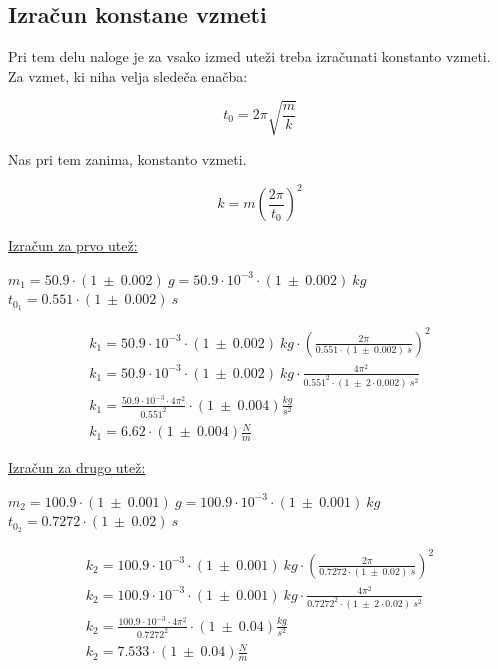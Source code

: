 \documentclass{report}
\begin{document}
\pagebreak

\subsection{Izračun konstane vzmeti}

\noindent Pri tem delu naloge je za vsako izmed uteži treba izračunati konstanto vzmeti.
\\
\noindent Za vzmet, ki niha velja sledeča enačba:

\begin{equation}
  t_0 = 2 \pi \sqrt{\frac{m}{k}}
\end{equation}

\noindent Nas pri tem zanima, konstanto vzmeti.

\begin{equation}
  k = m \left(\frac{2 \pi}{t_0}\right)^2
\end{equation}

\noindent \underline{Izračun za prvo utež:}

\noindent $m_1 = 50.9 \cdot (1 \ \pm \ 0.002) \ g = 50.9 \cdot 10^{-3} \cdot (1 \ \pm \ 0.002) \ kg$ \\
$t_{0_1} = 0.551 \cdot (1 \ \pm \ 0.002) \ s$

\begin{equation}
  \label{eq:1}
  \begin{gathered}
    k_1 = 50.9 \cdot 10^{-3} \cdot (1 \ \pm \ 0.002) \ kg \cdot \left(\frac{2 \pi}{0.551 \cdot (1 \ \pm \ 0.002) \ s}\right)^2 \\
    k_1 = 50.9 \cdot 10^{-3} \cdot (1 \ \pm \ 0.002) \ kg \cdot \frac{4 {\pi}^2}{0.551^2 \cdot (1 \ \pm \ 2 \cdot 0.002) \ s^2} \\
    k_1 = \frac{50.9 \cdot 10^{-3} \cdot 4 {\pi}^2}{0.551^2} \cdot (1 \ \pm \ 0.004) \frac{kg}{s^2} \\
    \boxed {k_1 = 6.62 \cdot (1 \ \pm \ 0.004) \frac{N}{m}}
  \end{gathered}
\end{equation}



\noindent \underline{Izračun za drugo utež:}

\noindent $m_2 = 100.9 \cdot (1 \ \pm \ 0.001) \ g = 100.9 \cdot 10^{-3} \cdot (1 \ \pm \ 0.001) \ kg$ \\
$t_{0_2} = 0.7272 \cdot (1 \ \pm \ 0.02) \ s$

\begin{equation}
  \label{eq:1}
  \begin{gathered}
    k_2 = 100.9 \cdot 10^{-3} \cdot (1 \ \pm \ 0.001) \ kg \cdot \left(\frac{2 \pi}{0.7272 \cdot (1 \ \pm \ 0.02) \ s}\right)^2 \\
    k_2 = 100.9 \cdot 10^{-3} \cdot (1 \ \pm \ 0.001) \ kg \cdot \frac{4 {\pi}^2}{0.7272^2 \cdot (1 \ \pm \ 2 \cdot 0.02) \ s^2} \\
    k_2 = \frac{100.9 \cdot 10^{-3} \cdot 4 {\pi}^2}{0.7272^2} \cdot (1 \ \pm \ 0.04) \frac{kg}{s^2} \\
    \boxed {k_2 = 7.533 \cdot (1 \ \pm \ 0.04) \frac{N}{m}}
  \end{gathered}
\end{equation}
\end{document}
